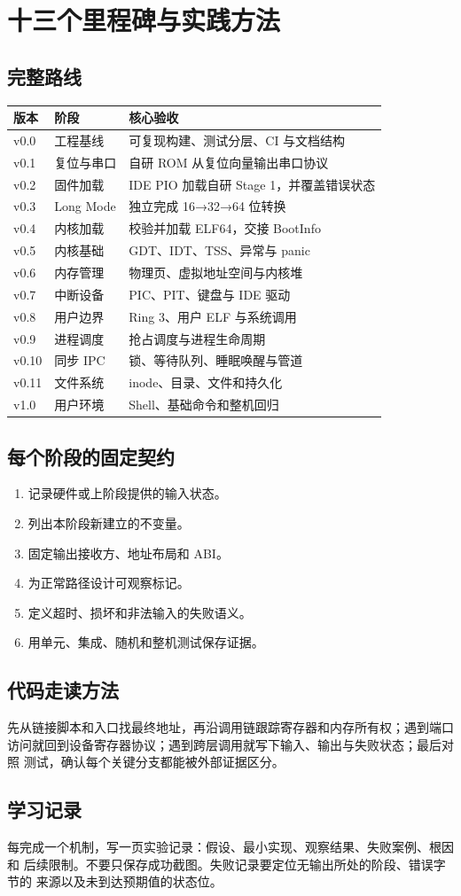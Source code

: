 \chapter{十三个里程碑与实践方法}

\section{完整路线}

\begin{longtable}{p{}p{}p{}}
\toprule
版本 & 阶段 & 核心验收 \\
\midrule
v0.0 & 工程基线 & 可复现构建、测试分层、CI 与文档结构 \\
v0.1 & 复位与串口 & 自研 ROM 从复位向量输出串口协议 \\
v0.2 & 固件加载 & IDE PIO 加载自研 Stage 1，并覆盖错误状态 \\
v0.3 & Long Mode & 独立完成 16→32→64 位转换 \\
v0.4 & 内核加载 & 校验并加载 ELF64，交接 BootInfo \\
v0.5 & 内核基础 & GDT、IDT、TSS、异常与 panic \\
v0.6 & 内存管理 & 物理页、虚拟地址空间与内核堆 \\
v0.7 & 中断设备 & PIC、PIT、键盘与 IDE 驱动 \\
v0.8 & 用户边界 & Ring 3、用户 ELF 与系统调用 \\
v0.9 & 进程调度 & 抢占调度与进程生命周期 \\
v0.10 & 同步 IPC & 锁、等待队列、睡眠唤醒与管道 \\
v0.11 & 文件系统 & inode、目录、文件和持久化 \\
v1.0 & 用户环境 & Shell、基础命令和整机回归 \\
\bottomrule
\end{longtable}

\section{每个阶段的固定契约}

\begin{enumerate}[label=\arabic*.]
  \item 记录硬件或上阶段提供的输入状态。
  \item 列出本阶段新建立的不变量。
  \item 固定输出接收方、地址布局和 ABI。
  \item 为正常路径设计可观察标记。
  \item 定义超时、损坏和非法输入的失败语义。
  \item 用单元、集成、随机和整机测试保存证据。
\end{enumerate}

\section{代码走读方法}

先从链接脚本和入口找最终地址，再沿调用链跟踪寄存器和内存所有权；遇到端口
访问就回到设备寄存器协议；遇到跨层调用就写下输入、输出与失败状态；最后对照
测试，确认每个关键分支都能被外部证据区分。

\section{学习记录}

每完成一个机制，写一页实验记录：假设、最小实现、观察结果、失败案例、根因和
后续限制。不要只保存成功截图。失败记录要定位无输出所处的阶段、错误字节的
来源以及未到达预期值的状态位。
